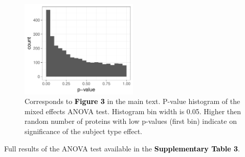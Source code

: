 \documentclass[11pt]{article}\usepackage[]{graphicx}\usepackage[usenames,dvipsnames]{color}
\newenvironment{knitrout}{}{} %
\begin{document}
\begin{figure}[h!]
\center
\begin{minipage}{1\textwidth}

\begin{knitrout}
\color{fgcolor}

{\centering \includegraphics[width=0.5\textwidth]{figure/lmer_anova_test_results-1} 

}



\end{knitrout}

\caption{Corresponds to
\textcolor{black}{\colorbox{highlighter}{\textbf{Figure 3}}} in the main text.
P-value histogram of the mixed effects ANOVA test. Histogram bin width is 0.05. Higher then random number of proteins with low p-values (first bin) indicate on significance of the subject type effect.}
\label{fig:PValueHistogram}
\end{minipage}
\end{figure}

Full results of the ANOVA test available in the 
\textcolor{black}{\colorbox{highlighter}{\textbf{Supplementary Table 3}}}.
\end{document}
